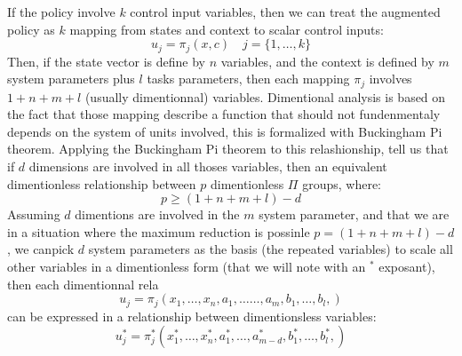 If the policy involve $k$ control input variables, then we can treat the augmented policy as $k$ mapping from states and context to scalar control inputs:
\begin{equation}
u_j = \pi_j \left(
x,
c 
\right) \quad j = \{ 1, \hdots , k \}
\end{equation}
Then, if the state vector is define by $n$ variables, and the context is defined by $m$ system parameters plus $l$ tasks parameters, then each mapping $\pi_j$ involves $1 + n + m + l$ (usually dimentionnal) variables. Dimentional analysis is based on the fact that those mapping describe a function that should not fundenmentaly depends on the system of units involved, this is formalized with Buckingham Pi theorem. Applying the Buckingham Pi theorem to this relashionship, tell us that if $d$ dimensions are involved in all thoses variables, then an equivalent dimentionless relationship between $p$ dimentionless $\Pi$ groups, where:
\begin{equation}
p \geq (1 + n + m + l ) - d
\end{equation}
Assuming $d$ dimentions are involved in the $m$ system parameter, and that we are in a situation where the maximum reduction is possinle $p = (1 + n + m + l ) - d$, we canpick $d$ system parameters as the basis (the repeated variables) to scale all other variables in a dimentionless form (that we will note with an ${}^*$ exposant), then each dimentionnal rela
\begin{equation}
u_j = \pi_j \left(
x_1, \hdots, x_n, 
a_1, \hdots \hdots, a_m, 
b_1, \hdots, b_l, 
\right) 
\end{equation}
can be expressed in a relationship between dimentionsless variables:
\begin{equation}
u_j^* = \pi_j^* \left(
x_1^*, \hdots, x_n^*, 
a_1^*, \hdots, a_{m-d}^*, 
b_1^*, \hdots, b_l^*, 
\right) 
\end{equation}

